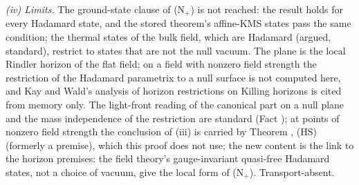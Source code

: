 \emph{(iv) Limits.} The ground-state clause of (N$_{+}$) is not reached: the result holds for every Hadamard state, and the stored theorem's affine-KMS states pass the same condition; the thermal states of the bulk field, which are Hadamard (argued, standard), restrict to states that are not the null vacuum. The plane is the local Rindler horizon of the flat field; on a field with nonzero field strength the restriction of the Hadamard parametrix to a null surface is not computed here, and Kay and Wald's analysis of horizon restrictions on Killing horizons is cited from memory only. The light-front reading of the canonical part on a null plane and the mass independence of the restriction are standard (Fact ); at points of nonzero field strength the conclusion of (iii) is carried by Theorem , (HS) (formerly a premise), which this proof does not use; the new content is the link to the horizon premises: the field theory's gauge-invariant quasi-free Hadamard states, not a choice of vacuum, give the local form of (N$_{+}$). Transport-absent.
